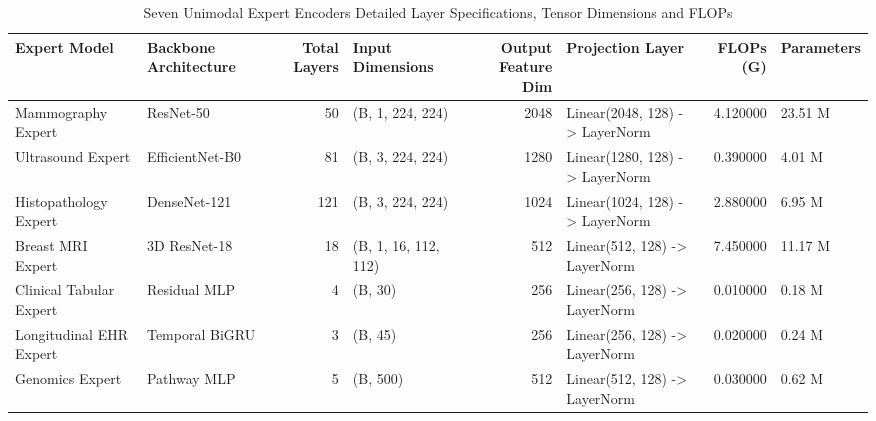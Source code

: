\begin{table}
\caption{Seven Unimodal Expert Encoders Detailed Layer Specifications, Tensor Dimensions and FLOPs}
\label{tab:supp_table_03_seven_unimodal_expert_encoders_detailed_layer_specifications}
\begin{tabular}{llrlrlrl}
\toprule
Expert Model & Backbone Architecture & Total Layers & Input Dimensions & Output Feature Dim & Projection Layer & FLOPs (G) & Parameters \\
\midrule
Mammography Expert & ResNet-50 & 50 & (B, 1, 224, 224) & 2048 & Linear(2048, 128) -> LayerNorm & 4.120000 & 23.51 M \\
Ultrasound Expert & EfficientNet-B0 & 81 & (B, 3, 224, 224) & 1280 & Linear(1280, 128) -> LayerNorm & 0.390000 & 4.01 M \\
Histopathology Expert & DenseNet-121 & 121 & (B, 3, 224, 224) & 1024 & Linear(1024, 128) -> LayerNorm & 2.880000 & 6.95 M \\
Breast MRI Expert & 3D ResNet-18 & 18 & (B, 1, 16, 112, 112) & 512 & Linear(512, 128) -> LayerNorm & 7.450000 & 11.17 M \\
Clinical Tabular Expert & Residual MLP & 4 & (B, 30) & 256 & Linear(256, 128) -> LayerNorm & 0.010000 & 0.18 M \\
Longitudinal EHR Expert & Temporal BiGRU & 3 & (B, 45) & 256 & Linear(256, 128) -> LayerNorm & 0.020000 & 0.24 M \\
Genomics Expert & Pathway MLP & 5 & (B, 500) & 512 & Linear(512, 128) -> LayerNorm & 0.030000 & 0.62 M \\
\bottomrule
\end{tabular}
\end{table}

